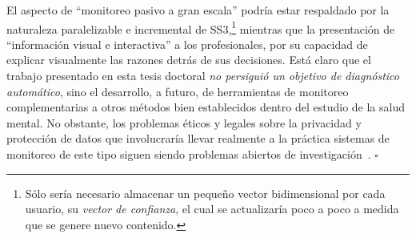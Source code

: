 El aspecto de ``monitoreo pasivo a gran escala'' podría estar respaldado por la naturaleza paralelizable e incremental de SS3,\footnote{Sólo sería necesario almacenar un pequeño vector bidimensional por cada usuario, su \emph{vector de confianza}, el cual se actualizaría poco a poco a medida que se genere nuevo contenido.} mientras que la presentación de ``información visual e interactiva'' a los profesionales, por su capacidad de explicar visualmente las razones detrás de sus decisiones.
Está claro que el trabajo presentado en esta tesis doctoral \emph{no persiguió un objetivo de diagnóstico automático}, sino el desarrollo, a futuro, de herramientas de monitoreo complementarias a otros métodos bien establecidos dentro del estudio de la salud mental.
No obstante, los problemas éticos y legales sobre la privacidad y protección de datos que involucraría llevar realmente a la práctica sistemas de monitoreo de este tipo siguen siendo problemas abiertos de investigación~\cite{guntuku2017detecting}. \hfill$\square$


